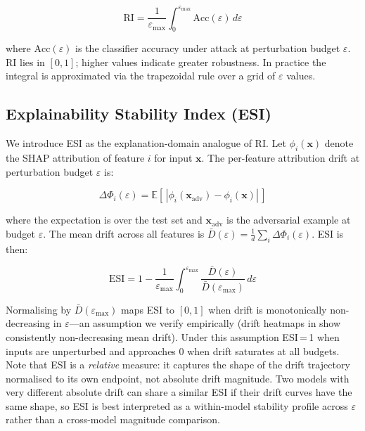 \documentclass[runningheads]{llncs}
\begin{document}
\begin{equation}
  \mathrm{RI} = \frac{1}{\varepsilon_{\max}}
  \int_0^{\varepsilon_{\max}} \mathrm{Acc}(\varepsilon)\, d\varepsilon
  \label{eq:ri}
\end{equation}

where $\mathrm{Acc}(\varepsilon)$ is the classifier accuracy under attack at
perturbation budget $\varepsilon$.  RI lies in $[0, 1]$; higher values indicate
greater robustness.  In practice the integral is approximated via the trapezoidal
rule over a grid of $\varepsilon$ values.

\subsection{Explainability Stability Index (ESI)}

We introduce ESI as the explanation-domain analogue of RI.  Let
$\phi_i(\mathbf{x})$ denote the SHAP attribution of feature $i$ for input
$\mathbf{x}$.  The per-feature attribution drift at perturbation budget
$\varepsilon$ is:

\begin{equation}
  \Delta\Phi_i(\varepsilon) =
  \mathbb{E}\!\left[\,\left|\phi_i(\mathbf{x}_{\mathrm{adv}})
  - \phi_i(\mathbf{x})\right|\,\right]
  \label{eq:drift}
\end{equation}

where the expectation is over the test set and $\mathbf{x}_{\mathrm{adv}}$ is
the adversarial example at budget $\varepsilon$.  The mean drift across all
features is $\bar{D}(\varepsilon) = \frac{1}{d}\sum_i \Delta\Phi_i(\varepsilon)$.
ESI is then:

\begin{equation}
  \mathrm{ESI} = 1 - \frac{1}{\varepsilon_{\max}}
  \int_0^{\varepsilon_{\max}}
  \frac{\bar{D}(\varepsilon)}{\bar{D}(\varepsilon_{\max})}\, d\varepsilon
  \label{eq:esi}
\end{equation}

Normalising by $\bar{D}(\varepsilon_{\max})$ maps ESI to $[0,1]$ when drift is
monotonically non-decreasing in $\varepsilon$---an assumption we verify empirically
(drift heatmaps in  show
consistently non-decreasing mean drift).  Under this assumption ESI\,=\,1 when
inputs are unperturbed and approaches 0 when drift saturates at all budgets.
Note that ESI is a \emph{relative} measure: it captures the shape of the drift
trajectory normalised to its own endpoint, not absolute drift magnitude.  Two
models with very different absolute drift can share a similar ESI if their drift
curves have the same shape, so ESI is best interpreted as a within-model
stability profile across $\varepsilon$ rather than a cross-model magnitude
comparison.
\end{document}
